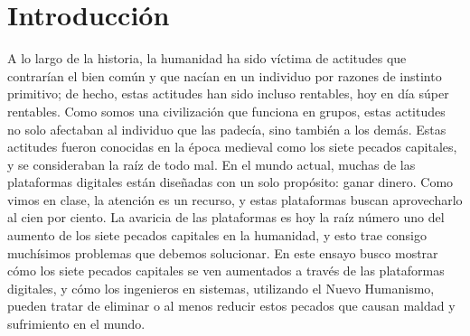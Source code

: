 \section{Introducción}
 
A lo largo de la historia, la humanidad ha sido víctima de actitudes que contrarían el bien común y que nacían en un individuo por razones de instinto primitivo; de hecho, estas actitudes han sido incluso rentables, hoy en día súper rentables. Como somos una civilización que funciona en grupos, estas actitudes no solo afectaban al individuo que las padecía, sino también a los demás. Estas actitudes fueron conocidas en la época medieval como los siete pecados capitales, y se consideraban la raíz de todo mal. En el mundo actual, muchas de las plataformas digitales están diseñadas con un solo propósito: ganar dinero. Como vimos en clase, la atención es un recurso, y estas plataformas buscan aprovecharlo al cien por ciento. La avaricia de las plataformas es hoy la raíz número uno del aumento de los siete pecados capitales en la humanidad, y esto trae consigo muchísimos problemas que debemos solucionar. En este ensayo busco mostrar cómo los siete pecados capitales se ven aumentados a través de las plataformas digitales, y cómo los ingenieros en sistemas, utilizando el Nuevo Humanismo, pueden tratar de eliminar o al menos reducir estos pecados que causan maldad y sufrimiento en el mundo.
 
